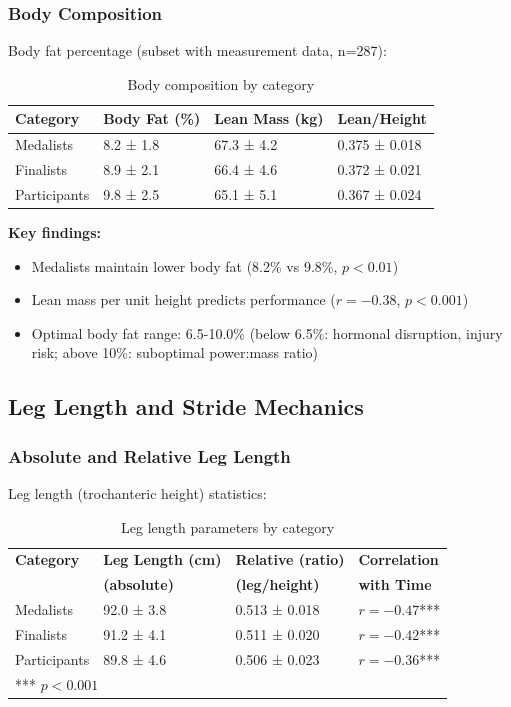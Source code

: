 \subsubsection{Body Composition}

Body fat percentage (subset with measurement data, n=287):

\begin{table}[H]
\centering
\caption{Body composition by category}
\begin{tabular}{@{}llll@{}}
\toprule
\textbf{Category} & \textbf{Body Fat (\%)} & \textbf{Lean Mass (kg)} & \textbf{Lean/Height} \\
\midrule
Medalists & 8.2 ± 1.8 & 67.3 ± 4.2 & 0.375 ± 0.018 \\
Finalists & 8.9 ± 2.1 & 66.4 ± 4.6 & 0.372 ± 0.021 \\
Participants & 9.8 ± 2.5 & 65.1 ± 5.1 & 0.367 ± 0.024 \\
\bottomrule
\end{tabular}
\end{table}

\textbf{Key findings:}
\begin{itemize}
    \item Medalists maintain lower body fat (8.2\% vs 9.8\%, $p < 0.01$)
    \item Lean mass per unit height predicts performance ($r = -0.38$, $p < 0.001$)
    \item Optimal body fat range: 6.5-10.0\% (below 6.5\%: hormonal disruption, injury risk; above 10\%: suboptimal power:mass ratio)
\end{itemize}

\subsection{Leg Length and Stride Mechanics}

\subsubsection{Absolute and Relative Leg Length}

Leg length (trochanteric height) statistics:

\begin{table}[H]
\centering
\caption{Leg length parameters by category}
\begin{tabular}{@{}llll@{}}
\toprule
\textbf{Category} & \textbf{Leg Length (cm)} & \textbf{Relative (ratio)} & \textbf{Correlation} \\
 & \textbf{(absolute)} & \textbf{(leg/height)} & \textbf{with Time} \\
\midrule
Medalists & 92.0 ± 3.8 & 0.513 ± 0.018 & $r = -0.47$*** \\
Finalists & 91.2 ± 4.1 & 0.511 ± 0.020 & $r = -0.42$*** \\
Participants & 89.8 ± 4.6 & 0.506 ± 0.023 & $r = -0.36$*** \\
\bottomrule
\multicolumn{4}{l}{\small{*** $p < 0.001$}}
\end{tabular}
\end{table}


